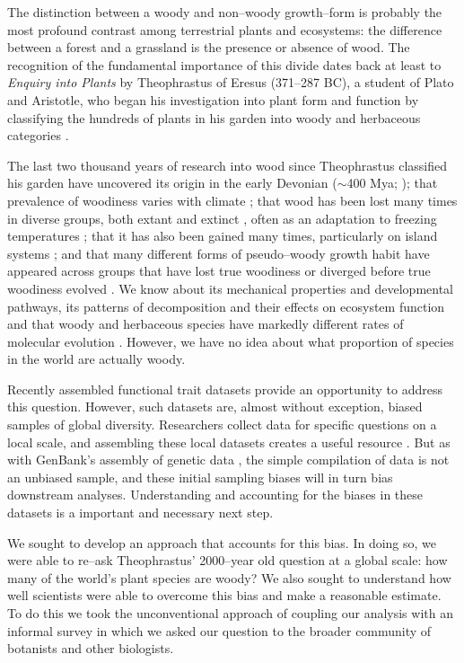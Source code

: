 \documentclass[a4paper,12pt]{article}
\begin{document}
The distinction between a woody and non--woody growth--form is
probably the most profound contrast among terrestrial plants and
ecosystems: the difference between a forest and a grassland is the
presence or absence of wood. The recognition of the fundamental
importance of this divide dates back at least to \textit{Enquiry into
  Plants} by Theophrastus of Eresus (371--287 BC), a student of
Plato and Aristotle, who began his investigation into plant form and
function by classifying the hundreds of plants in his garden into
woody and herbaceous categories \citep{theophrastus1916enquiry}.

The last two thousand years of research into wood since Theophrastus
classified his garden have uncovered its origin in the early Devonian
($\sim$400 Mya; \citealt{gerrienne2011simple}); that prevalence of
woodiness varies with climate \citep{Molesheihgt}; that wood has been
lost many times in diverse groups, both extant and extinct
\citep{judd1994}, often as an adaptation to freezing temperatures
\citep{Zanne}; that it has also been gained many times,
particularly on island systems \citep{Carlquist1974,Givnish1998};
and that many different forms of pseudo--woody growth
habit have appeared across groups that have lost true woodiness or
diverged before true woodiness evolved \citep{Cornwellwood}.  We know
about its mechanical properties and developmental pathways, its
patterns of decomposition and their effects on ecosystem function
\citep{Cornwellwood} and that woody and herbaceous species have
markedly different rates of molecular evolution \citep{SmithDonoghue}.
%
However, we have no idea about what proportion of species in the world
are actually woody.

Recently assembled functional trait datasets provide an opportunity to address this
question. However, such datasets are, almost without exception, biased samples of global diversity.  
Researchers collect data for specific questions on a local scale, and
assembling these local datasets creates a useful resource \citep{kattge2011try}. 
But as with GenBank's assembly of genetic data \citep{smith2011understanding},
the simple compilation of data is not an unbiased sample, and 
these initial sampling biases will in turn bias downstream analyses.
Understanding and accounting for the biases in these datasets is a 
important and necessary next step.

We sought to develop an approach that accounts for this bias.  In doing so, we 
were able to re--ask Theophrastus' 2000--year old
question at a global scale: how many of the world's plant species are
woody?
%
We also sought to understand how well scientists were able to overcome this bias and make a reasonable estimate.  To do this 
we took the unconventional approach of coupling our
analysis with an informal survey in which we asked our question
to the broader community of botanists and other biologists.
% 
\end{document}

